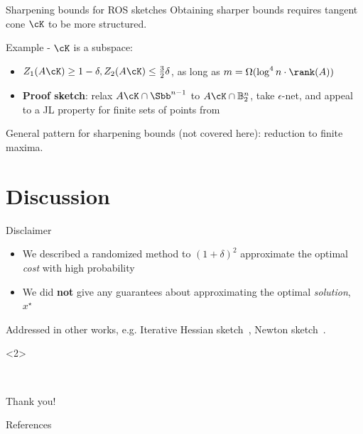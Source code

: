 \documentclass[10pt]{beamer}
\newcommand{\xstar}{x^{\star}}
\begin{document}
\begin{frame}{Sharpening bounds for ROS sketches}
    Obtaining sharper bounds requires tangent cone $\cK$ to be more structured.
    \vspace{1em}

    Example - $\cK$ is a subspace:
    \begin{itemize}
    \item $Z_1(A \cK) \geq 1 - \delta, Z_2(A \cK) \leq \frac{3}{2} \delta$,
    as long as $m = \Omega(\log^4 n \cdot \rank(A))$
    \item \textbf{Proof sketch}: relax $A \cK \cap \Sbb^{n-1}$ to
    $A \cK \cap \mathbb{B}_2^n$, take $\epsilon$-net, and appeal to a JL
    property for finite sets of points from~\cite{KraWard11}
    \end{itemize}

    General pattern for sharpening bounds (not covered here): reduction to
    finite maxima.
\end{frame}

\section{Discussion}

\begin{frame}{Disclaimer}
    \begin{itemize}
        \item We described a randomized method to $(1 + \delta)^2$ approximate
        the optimal \textit{\color{cred} cost} with high probability
        \item We did \textbf{not} give any guarantees about approximating the
        optimal \textit{\color{blue} solution}, $\xstar$
    \end{itemize}
    Addressed in other works, e.g. Iterative Hessian sketch~\cite{PilWain16},
    Newton sketch~\cite{PilWain17}.

    \vspace{1em}

    <2>
\end{frame}

\begin{frame}{~}
    \begin{center}
        \Large Thank you!
    \end{center}
\end{frame}

\begin{frame}[allowframebreaks]{References}


\end{frame}
\end{document}
